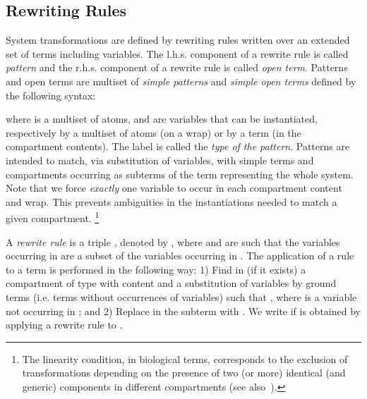 \subsection{Rewriting Rules}
\label{CWC_formalism - rewriting}

System transformations are defined by rewriting rules written over an
extended set of terms including variables. The l.h.s. component  of a rewrite rule  is called  \emph{pattern} and  the r.h.s. component  of a rewrite rule is called \emph{open term}.  Patterns and open terms are multiset of \emph{simple patterns}  and \emph{simple open terms}  defined by the following syntax:


where  is a multiset of atoms,  and  are
variables that can be instantiated, respectively by a multiset of atoms (on a wrap) or by a term (in the  compartment contents). The label  is called the \emph{type of the pattern}. Patterns are intended to match, via substitution of variables, with simple terms and compartments occurring as subterms of the term representing the whole system. Note that we force \emph{exactly} one variable to occur in each
compartment content and wrap.
 This prevents ambiguities in the instantiations needed to match a given compartment.
 \footnote{
The linearity condition, in biological terms, corresponds to the exclusion of transformations depending on the presence of two (or more)
 identical (and generic) components in different compartments (see also~\cite{OP11}).}

A \emph{rewrite rule} is a triple , denoted by , where  and  are such that the variables occurring in  are a subset of the variables occurring in .
The application of a rule  to a term  is performed in the following way: 1) Find in  (if it
exists) a compartment of type  with content  and a substitution  of variables by ground terms (i.e. terms without occurrences of variables) such that , where  is a variable not occurring in ; and 2) Replace in  the
subterm  with . We write   if  is obtained  by applying a rewrite rule to  .


